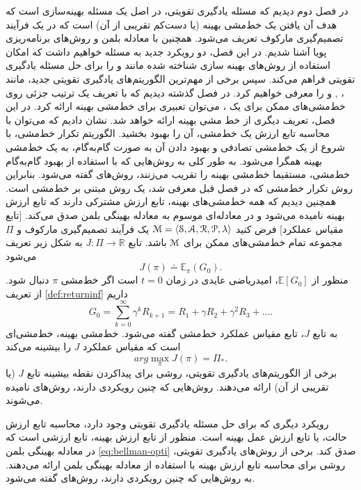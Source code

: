 
در فصل دوم دیدیم که مسئله یادگیری تقویتی، در اصل یک مسئله بهینه‌سازی است که هدف آن یافتن یک خط‌مشی بهینه (یا دست‌کم تقریبی از آن) است که در یک فرآیند تصمیم‌گیری مارکوف تعریف می‌شود. همچنین  با معادله بلمن و روش‌های برنامه‌ریزی پویا آشنا شدیم. در این فصل، دو رویکرد جدید به مسئله خواهیم داشت که امکان استفاده از روش‌های بهینه سازی شناخته شده مانند 
\textit{}
و
\textit{}
را برای حل مسئله یادگیری تقویتی فراهم می‌کند. سپس برخی از مهم‌ترین الگوریتم‌های یادگیری تقویتی جدید، مانند
،
,
 و 
  را معرفی خواهیم کرد. 
 در فصل گذشته  دیدیم که با تعریف یک ترتیب جزئی روی خط‌مشی‌های ممکن برای یک
،
می‌توان تعبیری برای خط‌مشی بهینه ارائه کرد. در این فصل، تعریف دیگری از خط مشی بهینه ارائه خواهد شد.  نشان دادیم که می‌توان با محاسبه تابع ارزش یک خط‌مشی، آن را بهبود بخشید. الگوریتم تکرار خط‌مشی، با شروع از یک خط‌مشی تصادفی و بهبود دادن آن به صورت گام‌به‌گام، به یک خط‌مشی بهینه همگرا می‌شود.  به طور کلی به روش‌هایی که با استفاده از بهبود گام‌به‌گام خط‌مشی، مستقیما خط‌مشی بهینه  را تقریب می‌زنند، روش‌های 
\textit{}
گفته می‌شود. بنابراین روش تکرار خط‌مشی که در فصل قبل معرفی شد، یک روش مبتنی بر خط‌مشی است.
 همچنین دیدیم که همه خط‌مشی‌های بهینه، تابع ارزش مشترکی دارند که تابع ارزش بهینه نامیده  می‌شود و در معادله‌ای موسوم به معادله بهینگی بلمن صدق می‌کند.
[تابع مقیاس عملکرد] فرض کنید 
$\EuScript{M} = \left< \EuScript{S},\EuScript{A},\EuScript{R},\EuScript{P}, \lambda \right>$ 
یک فرآیند تصمیم‌گیری مارکوف و $\Pi$ مجموعه تمام خط‌مشی‌های ممکن برای $\EuScript{M}$ باشد. تابع 
$J: \Pi \to \mathbb{R}$
به شکل زیر تعریف می‌شود
$$J(\pi) \doteq \mathbb{E}_\pi(G_0).$$
منظور از 
$\mathbb{E}[G_0]$،
امیدریاضی عایدی در زمان 
$t=0$
است اگر خط‌مشی $\pi$ دنبال شود. از تعریف 
\ref{def:returninf}
داریم
$$G_0 = \sum_{k=0}^{\infty} \gamma^{k} R_{k+1} = R_1 + \gamma R_2 + \gamma^2 R_3 + \dots .$$
به تابع $J$، تابع مقیاس عملکرد خط‌مشی گفته می‌شود.
خط‌مشی بهینه، خط‌مشی‌ای است که مقیاس عملکرد $J$ را بیشینه می‌کند
$$arg \max_{\pi} J(\pi) = \Pi_*.$$
برخی از الگوریتم‌های یادگیری تقویتی، روشی برای پیداکردن نقطه بیشینه تابع $J$ (یا تقریبی از آن) ارائه می‌دهند. روش‌هایی که چنین رویکردی دارند، روش‌های 
\textit{}
 نامیده می‌شوند.
 
 رویکرد دیگری که برای حل مسئله یادگیری تقویتی وجود دارد، محاسبه تابع ارزش حالت، یا تابع ارزش عمل بهینه است. منظور از تابع ارزش بهینه، تابع ارزشی است که در معادله بهینگی بلمن 
 \ref{eq:bellman-opti}
 صدق کند. برخی از روش‌های یادگیری تقویتی، روشی برای محاسبه تابع ارزش بهینه با استفاده از معادله بهینگی بلمن ارائه می‌دهند. به روش‌هایی که چنین رویکردی دارند، روش‌های 
 \textit{
 	}
 گفته می‌شود.

